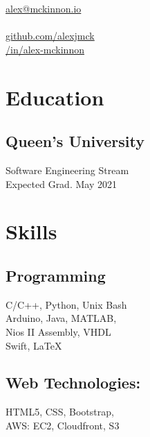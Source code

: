 \documentclass[]{hieudo-build}
\begin{document}
%
%
{
	\faEnvelope \href{mailto:alex@mckinnon.io}{ alex@mckinnon.io}\\
	 \\
	\faGithub \href{https://github.com/alexjmck}{   github.com/alexjmck}\\
	\faLinkedinSquare \href{https://www.linkedin.com/in/alex-mckinnon}{   /in/alex-mckinnon}
}
    
%
%
\begin{minipage}[t]{0.3\textwidth} 

\section{Education} 

\subsection{Queen's University}
Software Engineering Stream \\
Expected Grad. May 2021 \\
\sectionsep

\section{Skills}
\subsection{Programming}
C/C++, Python, Unix Bash\\ 
Arduino, Java, MATLAB, \\Nios II Assembly, VHDL\\ 
Swift, \LaTeX

\subsection{Web Technologies:}
HTML5, CSS, Bootstrap, \\
AWS: EC2, Cloudfront, S3 \\


\end{minipage}
\end{document}
